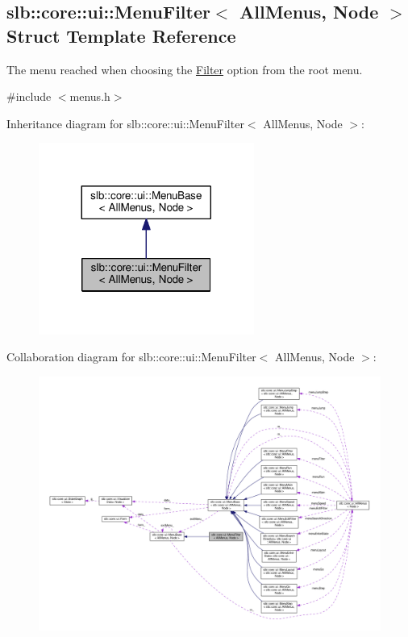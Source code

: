 \hypertarget{structslb_1_1core_1_1ui_1_1MenuFilter}{}\subsection{slb\+:\+:core\+:\+:ui\+:\+:Menu\+Filter$<$ All\+Menus, Node $>$ Struct Template Reference}
\label{structslb_1_1core_1_1ui_1_1MenuFilter}


The menu reached when choosing the \hyperlink{structslb_1_1core_1_1ui_1_1Filter}{Filter} option from the root menu.  




{\ttfamily \#include $<$menus.\+h$>$}



Inheritance diagram for slb\+:\+:core\+:\+:ui\+:\+:Menu\+Filter$<$ All\+Menus, Node $>$\+:\nopagebreak
\begin{figure}[H]
\begin{center}
\leavevmode
\includegraphics[width=200pt]{structslb_1_1core_1_1ui_1_1MenuFilter__inherit__graph}
\end{center}
\end{figure}


Collaboration diagram for slb\+:\+:core\+:\+:ui\+:\+:Menu\+Filter$<$ All\+Menus, Node $>$\+:\nopagebreak
\begin{figure}[H]
\begin{center}
\leavevmode
\includegraphics[width=350pt]{structslb_1_1core_1_1ui_1_1MenuFilter__coll__graph}
\end{center}
\end{figure}
